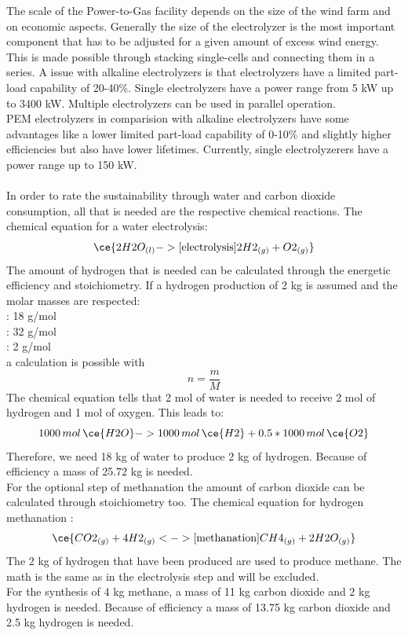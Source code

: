\begin{parcolumns}[colwidths={1=2.5 cm, 2=10 cm, 3=2.5 cm}]{3}
{The scale of the Power-to-Gas facility depends on the size of the wind farm and on economic aspects. Generally the size of the electrolyzer is the most important component that has to be adjusted for a given amount of excess wind energy. \\
This is made possible through stacking single-cells and connecting them in a series. A issue with alkaline electrolyzers is that electrolyzers have a limited part-load capability of 20-40\%. Single electrolyzers have a power range from 5 kW up to 3400 kW. Multiple electrolyzers can be used in parallel operation. 
\\
PEM electrolyzers in comparision with alkaline electrolyzers have some advantages like a lower limited part-load capability of 0-10\% and slightly higher efficiencies but also have lower lifetimes. Currently, single electrolyzerers have a power range up to 150 kW. 
\\ \\
In order to rate the sustainability through water and carbon dioxide consumption, all that is needed are the respective chemical reactions. The chemical equation for a water electrolysis: \\
\[\ce{2 H2O_{(l)}  ->[\text{electrolysis}] 2 H2_{(g)} + O2_{(g)}}\]
The amount of hydrogen that is needed can be calculated through the energetic efficiency and stoichiometry.
If a hydrogen production of 2 kg is assumed and the molar masses are respected: \\
 : 18 g/mol \\
 : 32 g/mol \\
 : 2 g/mol \\
a calculation is possible with \[ n = \dfrac{m}{M} \] The chemical equation tells that 2 mol of water is needed to receive 2 mol of hydrogen and 1 mol of oxygen. This leads to:
\[ 1000 \, mol \, \ce{H2O} -> 1000 \,  mol \,  \ce{H2} + 0.5*1000 \, mol \, \ce{O2} \]
Therefore, we need 18 kg of water to produce 2 kg of hydrogen. Because of efficiency a mass of 25.72 kg is needed. \\
For the optional step of methanation the amount of carbon dioxide can be calculated through stoichiometry too.
The chemical equation for hydrogen methanation :
\[\ce{CO2_{(g)} +  4 H2_{(g)} <->[\text{methanation}]  CH4_{(g)} + 2 H2O_{(g)}}\] 
The 2 kg of hydrogen that have been produced are used to produce methane. The math is the same as in the electrolysis step and will be excluded. \\
For the synthesis of 4 kg methane, a mass of 11 kg carbon dioxide and 2 kg hydrogen is needed. Because of efficiency a mass of 13.75 kg carbon dioxide and 2.5 kg hydrogen is needed.
}
\end{parcolumns}
